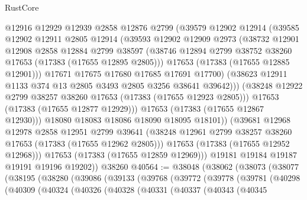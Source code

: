 \begin{lexlean}{RustCore}
\begin{coremodule}
                  @12916
                  @12929
                  @12939
                  @2858
                  @12876
                  @2799
                  (@39579
                    @12902
                    @12914
                    (@39585
                      @12902
                      @12911
                      @2805
                      @12914
                      (@39593
                        @12902
                        @12909
                        @2973
                        (@38732
                          @12901
                          @12908
                          @2858
                          @12884
                          @2799
                          @38597
                          (@38746 @12894 @2799 @38752 @38260 @17653 (@17383 (@17655 @12895 @2805)))
                          @17653
                          (@17383 (@17655 @12885 @12901)))
                        @17671
                        @17675
                        @17680
                        @17685
                        @17691
                        @17700)
                      (@38623 @12911 @1133 @374 @13 @2805 @3493 @2805 @3256 @38641 @39642)))
                  (@38248 @12922 @2799 @38257 @38260 @17653 (@17383 (@17655 @12923 @2805)))
                  @17653
                  (@17383 (@17655 @12877 @12929)))
                @17653
                (@17383 (@17655 @12867 @12930)))
              @18080
              @18083
              @18086
              @18090
              @18095
              @18101))
          (@39681
            @12968
            @12978
            @2858
            @12951
            @2799
            @39641
            (@38248 @12961 @2799 @38257 @38260 @17653 (@17383 (@17655 @12962 @2805)))
            @17653
            (@17383 (@17655 @12952 @12968)))
          @17653
          (@17383 (@17655 @12859 @12969)))
        @19181
        @19184
        @19187
        @19191
        @19196
        @19202))
    @38260
@40564 := @38048
    (@38062
      (@38073
        (@38077
          (@38195
            (@38280
              (@39086
                (@39133
                  (@39768
                    (@39772
                      (@39778
                        (@39781
                          (@40298
                            (@40309
                              (@40324
                                (@40326
                                  (@40328
                                    (@40331
                                      (@40337
                                        (@40343
                                          (@40345

\end{coremodule}
\end{lexlean}
